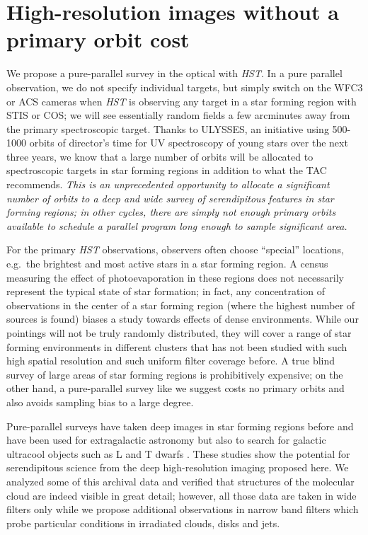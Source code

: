 \documentclass[12pt]{article}
\begin{document}
\section{High-resolution images without a primary orbit cost}
We propose a pure-parallel survey in the optical with \emph{HST}. In a pure
parallel observation, we do not specify individual targets, but simply switch
on the WFC3 or ACS cameras when \emph{HST} is observing any target in a star
forming region with STIS or COS; we will see essentially random fields a few
arcminutes away from the primary spectroscopic target. Thanks to ULYSSES, an
initiative using 500-1000 orbits of director's time for UV spectroscopy of
young stars over the next three years, we know that a large number of orbits
will be allocated to spectroscopic targets in star forming regions in addition
to what the TAC recommends. \emph{This is an unprecedented opportunity to allocate a significant number of orbits to a deep and wide survey of serendipitous features in star forming regions; in other cycles, there are simply not enough primary orbits available to schedule a parallel program long enough to sample significant area.}

For the primary
\emph{HST} observations, observers often choose ``special'' locations,
e.g.\ the brightest and most active stars in a star forming region. A census
measuring the effect of photoevaporation in these regions does not necessarily
represent the typical state of star formation; in fact, any concentration of
observations in the center of a star forming region (where the highest number
of sources is found) biases a study towards effects of dense
environments. While our pointings will not be truly randomly distributed, they
will cover a range of star forming environments in different clusters that has
not been studied with such high spatial resolution and such uniform filter
coverage before. A true blind survey of large areas of star forming regions is prohibitively expensive; on the other hand, a pure-parallel survey like we suggest costs no primary orbits and also avoids sampling bias to a large degree.

Pure-parallel surveys have taken deep images in star forming regions before and
have been used for extragalactic astronomy \citep{2007A&A...468..823S} but also
to search for galactic ultracool objects such as L and T dwarfs
\citep{2005ApJ...631L.159R}. These studies show the potential for serendipitous
science from the deep high-resolution imaging proposed here. We analyzed some of this archival data and verified that structures of the
molecular cloud are indeed visible in great detail; however, all those data are
taken in wide filters only while we propose additional observations in narrow
band filters which probe particular conditions in irradiated clouds, disks and
jets.
\end{document}
